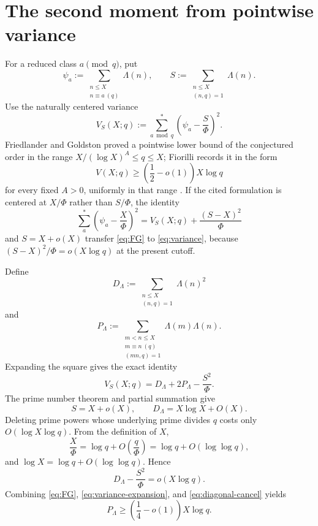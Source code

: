 \documentclass[11pt]{article}
\theoremstyle{definition}
\theoremstyle{remark}
\begin{document}
\section{The second moment from pointwise variance}

For a reduced class $a\pmod q$, put
\[
  \psi_a:=\sum_{\substack{n\le X\\ n\equiv a\ (q)}}\Lambda(n),
  \qquad
  S:=\sum_{\substack{n\le X\\(n,q)=1}}\Lambda(n).
\]
Use the naturally centered variance
\begin{equation}\label{eq:variance}
  V_S(X;q):=\sum_{a\bmod q}^{*}
  \left(\psi_a-\frac{S}{\Phi}\right)^2.
\end{equation}
Friedlander and Goldston proved a pointwise lower bound of the conjectured order in the range $X/(\log X)^A\le q\le X$; Fiorilli records it in the form
\begin{equation}\label{eq:FG}
  V(X;q)\ge \left(\frac12-o(1)\right)X\log q
\end{equation}
for every fixed $A>0$, uniformly in that range \cite{FriedlanderGoldston1996,Fiorilli2015}.
If the cited formulation is centered at $X/\Phi$ rather than $S/\Phi$, the identity
\[
  \sum_a^*\left(\psi_a-\frac{X}{\Phi}\right)^2
  =V_S(X;q)+\frac{(S-X)^2}{\Phi}
\]
and $S=X+o(X)$ transfer \eqref{eq:FG} to \eqref{eq:variance}, because $(S-X)^2/\Phi=o(X\log q)$ at the present cutoff.

Define
\[
  D_\Lambda:=\sum_{\substack{n\le X\\(n,q)=1}}\Lambda(n)^2
\]
and
\[
  P_\Lambda:=
  \sum_{\substack{m<n\le X\\m\equiv n\ (q)\\(mn,q)=1}}
  \Lambda(m)\Lambda(n).
\]
Expanding the square gives the exact identity
\begin{equation}\label{eq:variance-expansion}
  V_S(X;q)=D_\Lambda+2P_\Lambda-\frac{S^2}{\Phi}.
\end{equation}
The prime number theorem and partial summation give
\[
  S=X+o(X),\qquad D_\Lambda=X\log X+O(X).
\]
Deleting prime powers whose underlying prime divides $q$ costs only $O(\log X\log q)$.
From the definition of $X$,
\[
  \frac{X}{\Phi}=\log q+O\!\left(\frac q\Phi\right)
  =\log q+O(\log\log q),
\]
and $\log X=\log q+O(\log\log q)$. Hence
\begin{equation}\label{eq:diagonal-cancel}
  D_\Lambda-\frac{S^2}{\Phi}=o(X\log q).
\end{equation}
Combining \eqref{eq:FG}, \eqref{eq:variance-expansion}, and \eqref{eq:diagonal-cancel} yields
\begin{equation}\label{eq:weighted-pairs}
  P_\Lambda\ge \left(\frac14-o(1)\right)X\log q.
\end{equation}
\end{document}
